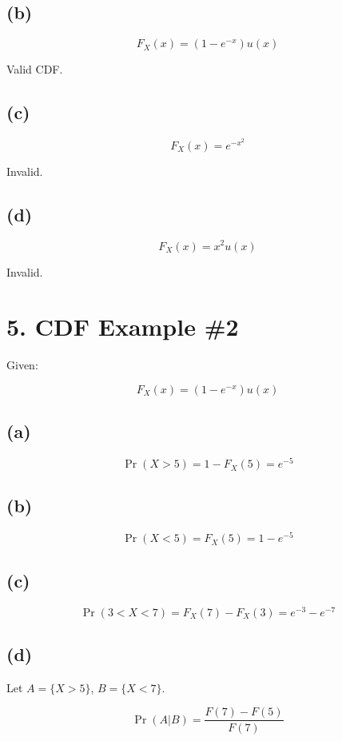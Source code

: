 \documentclass[12pt]{article}
\begin{document}
\subsection*{(b)}

\[
F_X(x)=(1-e^{-x})u(x)
\]

Valid CDF.

\subsection*{(c)}

\[
F_X(x)=e^{-x^2}
\]

Invalid.

\subsection*{(d)}

\[
F_X(x)=x^2u(x)
\]

Invalid.

\section*{5. CDF Example \#2}

Given:

\[
F_X(x)=(1-e^{-x})u(x)
\]

\subsection*{(a)}

\[
\Pr(X>5)=1-F_X(5)=e^{-5}
\]

\subsection*{(b)}

\[
\Pr(X<5)=F_X(5)=1-e^{-5}
\]

\subsection*{(c)}

\[
\Pr(3<X<7)=F_X(7)-F_X(3)=e^{-3}-e^{-7}
\]

\subsection*{(d)}

Let $A=\{X>5\}$, $B=\{X<7\}$.

\[
\Pr(A|B)=\frac{F(7)-F(5)}{F(7)}
\]
\end{document}
